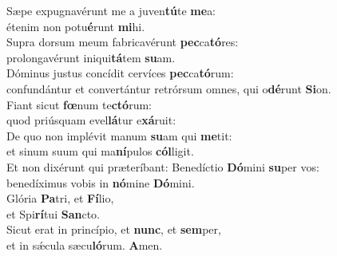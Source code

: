 \evenverse Sæpe expugnavérunt me a juven\textbf{tú}te \textbf{me}a:~\*\\
\evenverse étenim non potu\textbf{é}runt \textbf{mi}hi.\\
\oddverse Supra dorsum meum fabricavérunt \textbf{pec}ca\textbf{tó}res:~\*\\
\oddverse prolongavérunt iniqui\textbf{tá}tem \textbf{su}am.\\
\evenverse Dóminus justus concídit cervíces \textbf{pec}ca\textbf{tó}rum:~\*\\
\evenverse confundántur et convertántur retrórsum omnes, qui o\textbf{dé}runt \textbf{Si}on.\\
\oddverse Fiant sicut \textbf{fœ}num te\textbf{ctó}rum:~\*\\
\oddverse quod priúsquam evel\textbf{lá}tur e\textbf{xá}ruit:\\
\evenverse De quo non implévit manum \textbf{su}am qui \textbf{me}tit:~\*\\
\evenverse et sinum suum qui ma\textbf{ní}pulos \textbf{cól}ligit.\\
\oddverse Et non dixérunt qui præteríbant: Benedíctio \textbf{Dó}mini \textbf{su}per vos:~\*\\
\oddverse benedíximus vobis in \textbf{nó}mine \textbf{Dó}mini.\\
\evenverse Glória \textbf{Pa}tri, et \textbf{Fí}lio,~\*\\
\evenverse et Spi\textbf{rí}tui \textbf{San}cto.\\
\oddverse Sicut erat in princípio, et \textbf{nunc}, et \textbf{sem}per,~\*\\
\oddverse et in sǽcula sæcu\textbf{ló}rum. \textbf{A}men.\\
